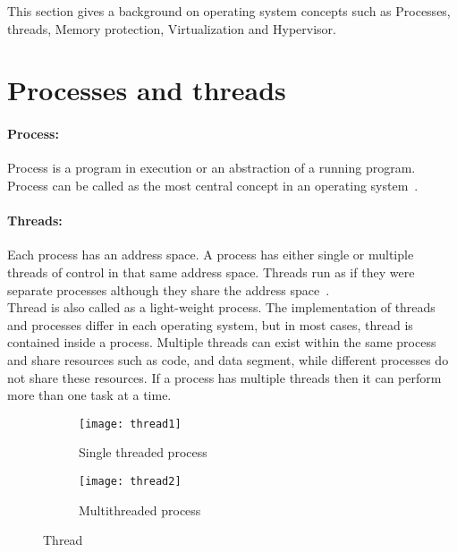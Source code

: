 This section gives a background on operating system concepts such as Processes, threads, Memory protection, Virtualization and Hypervisor.
\section{Processes and threads}
\paragraph{Process:} Process is a program in execution or an abstraction of a running program. Process can be called as the most central concept in an operating system~\cite{Galvin}.

\paragraph{Threads:} Each process has an address space. A process has either single or multiple threads of control in that same address space. Threads run as if they were separate processes although they share the address space~\cite{Galvin}.
\\
Thread is also called as a light-weight process. The implementation of threads and processes differ in each operating system, but in most cases, thread is contained inside a process. Multiple threads can exist within the same process and share resources such as code, and data segment, while different processes do not share these resources. If a process has multiple threads then it can perform more than one task at a time.
\begin{figure}[!ht]
    \centering
    \begin{subfigure}[b]{0.45\textwidth}
	\texttt{[image: thread1]}
	\caption{Single threaded process}
	\label{fig:thread1}
    \end{subfigure}
	\hfill
    \begin{subfigure}[b]{0.45\textwidth}
	\texttt{[image: thread2]}
	\caption{Multithreaded process}
	\label{fig:thread2}
    \end{subfigure}
    \caption{Thread}\label{fig:threads}
\end{figure}

